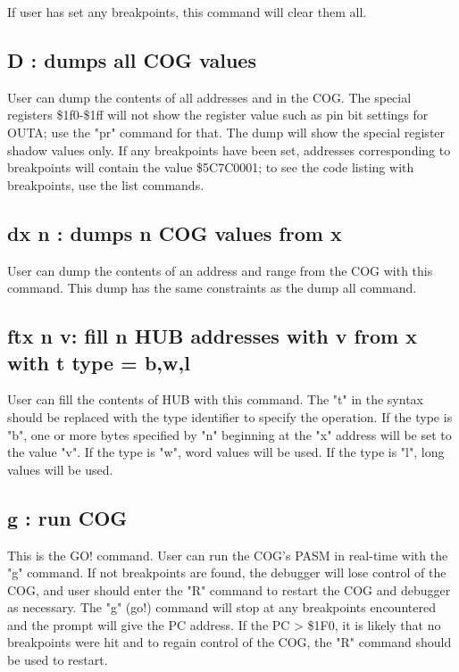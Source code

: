\documentclass{article}
\numberwithin{equation}{section} %
\begin{document}
If user has set any breakpoints, this command will clear them all.


\subsection{D      : dumps all COG values}

User can dump the contents of all addresses and in the COG. The special registers
\$1f0-\$1ff will not show the register value such as pin bit settings for OUTA; use
the "pr" command for that. The dump will show the special register shadow values
only. If any breakpoints have been set, addresses corresponding to breakpoints will
contain the value \$5C7C0001; to see the code listing with breakpoints, use the list
commands.


\subsection{dx n   : dumps n COG values from x}

User can dump the contents of an address and range from the COG with this command.
This dump has the same constraints as the dump all command.


\subsection{ftx n v: fill n HUB addresses with v from x with t type = b,w,l}

User can fill the contents of HUB with this command. The "t" in the syntax should
be replaced with the type identifier to specify the operation. If the type is "b",
one or more bytes specified by "n" beginning at the "x" address will be set to the
value "v". If the type is "w", word values will be used. If the type is "l", long
values will be used.


\subsection{g      : run COG}

This is the GO! command. User can run the COG's PASM in real-time with the "g"
command. If not breakpoints are found, the debugger will lose control of the COG,
and user should enter the "R" command to restart the COG and debugger as necessary.
The "g" (go!) command will stop at any breakpoints encountered and the prompt
will give the PC address. If the PC > \$1F0, it is likely that no breakpoints
were hit and to regain control of the COG, the "R" command should be used to restart.
\end{document}
